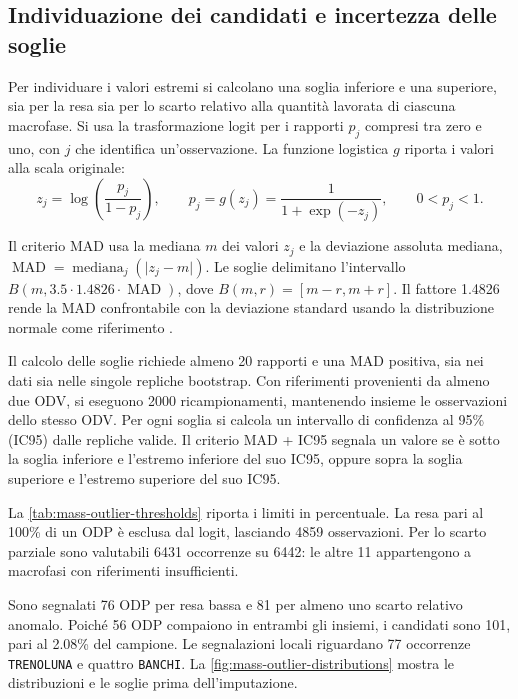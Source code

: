 \subsection{Individuazione dei candidati e incertezza delle soglie}
\label{sec:mass-outlier-detection}

Per individuare i valori estremi si calcolano una soglia inferiore e una superiore, sia per la resa sia per lo scarto relativo alla quantità lavorata di ciascuna macrofase. Si usa la trasformazione logit per i rapporti $p_j$ compresi tra zero e uno, con $j$ che identifica un'osservazione. La funzione logistica $g$ riporta i valori alla scala originale:
\begin{equation}
\label{eq:mass-logit-transform}
z_j=\log\left(\frac{p_j}{1-p_j}\right),
\qquad
p_j=g(z_j)=\frac{1}{1+\exp(-z_j)},
\qquad 0<p_j<1.
\end{equation}

Il criterio MAD usa la mediana $m$ dei valori $z_j$ e la deviazione assoluta mediana, $\operatorname{MAD}=\operatorname{mediana}_j(\lvert z_j-m\rvert)$. Le soglie delimitano l'intervallo $B(m,3.5\cdot1.4826\cdot\operatorname{MAD})$, dove $B(m,r)=[m-r,m+r]$.
Il fattore \num{1.4826} rende la MAD confrontabile con la deviazione standard usando la distribuzione normale come riferimento \parencite{nist2016mad}.

Il calcolo delle soglie richiede almeno 20 rapporti e una MAD positiva, sia nei dati sia nelle singole repliche bootstrap. Con riferimenti provenienti da almeno due ODV, si eseguono \num{2000} ricampionamenti, mantenendo insieme le osservazioni dello stesso ODV. Per ogni soglia si calcola un intervallo di confidenza al 95\% (IC95) dalle repliche valide. Il criterio MAD + IC95 segnala un valore se è sotto la soglia inferiore e l'estremo inferiore del suo IC95, oppure sopra la soglia superiore e l'estremo superiore del suo IC95.

La \cref{tab:mass-outlier-thresholds} riporta i limiti in percentuale. La resa pari al 100\% di un ODP è esclusa dal logit, lasciando \num{4859} osservazioni. Per lo scarto parziale sono valutabili \num{6431} occorrenze su \num{6442}: le altre 11 appartengono a macrofasi con riferimenti insufficienti.



Sono segnalati 76 ODP per resa bassa e 81 per almeno uno scarto relativo anomalo. Poiché 56 ODP compaiono in entrambi gli insiemi, i candidati sono 101, pari al \num{2.08}\% del campione. Le segnalazioni locali riguardano 77 occorrenze \texttt{TRENOLUNA} e quattro \texttt{BANCHI}. La \cref{fig:mass-outlier-distributions} mostra le distribuzioni e le soglie prima dell'imputazione.

